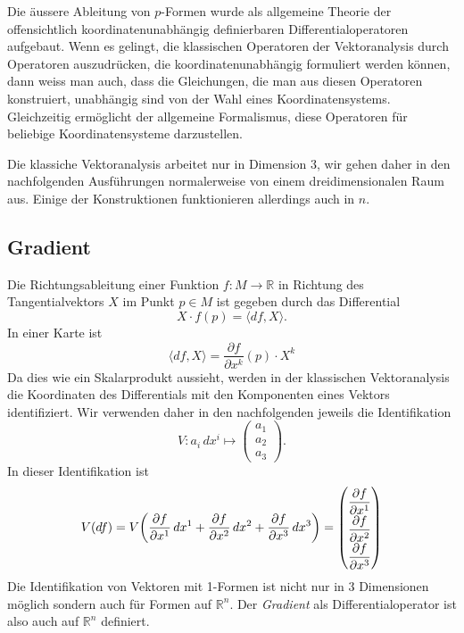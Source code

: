 Die äussere Ableitung von $p$-Formen wurde als allgemeine Theorie
der offensichtlich koordinatenunabhängig definierbaren
Differentialoperatoren aufgebaut.
Wenn es gelingt, die klassischen Operatoren der Vektoranalysis
durch Operatoren auszudrücken, die koordinatenunabhängig formuliert
werden können, dann weiss man auch, dass die Gleichungen, die man
aus diesen Operatoren konstruiert, unabhängig sind von der Wahl
eines Koordinatensystems.
Gleichzeitig ermöglicht der allgemeine Formalismus, diese Operatoren
für beliebige Koordinatensysteme darzustellen.

Die klassiche Vektoranalysis arbeitet nur in Dimension 3, wir gehen
daher in den nachfolgenden Ausführungen normalerweise von einem
dreidimensionalen Raum aus.
Einige der Konstruktionen funktionieren allerdings auch in $n$.

%
%
\subsection{Gradient}
Die Richtungsableitung einer Funktion $f\colon M\to\mathbb{R}$ in 
%
Richtung des Tangentialvektors $X$ im Punkt $p\in M$ ist gegeben
durch das Differential
\[
X\cdot f(p) = \langle df, X\rangle.
\]
In einer Karte ist
\[
\langle df,X\rangle
=
\frac{\partial f}{\partial x^k}(p)
\cdot X^k
\]
Da dies wie ein Skalarprodukt aussieht, werden in der klassischen
Vektoranalysis die Koordinaten des Differentials mit den Komponenten
eines Vektors identifiziert.
Wir verwenden daher in den nachfolgenden jeweils die Identifikation
\[
V\colon
a_i\,dx^i \mapsto \begin{pmatrix} a_1\\a_2\\a_3\end{pmatrix}.
\]
In dieser Identifikation ist
\[
V(df)
=
V\biggl(
\frac{\partial f}{\partial x^1}\,dx^1
+
\frac{\partial f}{\partial x^2}\,dx^2
+
\frac{\partial f}{\partial x^3}\,dx^3
\biggr)
=
\renewcommand{\arraystretch}{1.8}
\begin{pmatrix}
\displaystyle\frac{\partial f}{\partial x^1}\\
\displaystyle\frac{\partial f}{\partial x^2}\\
\displaystyle\frac{\partial f}{\partial x^3}
\end{pmatrix}
\]
Die Identifikation von Vektoren mit 1-Formen ist nicht nur in 
3 Dimensionen möglich sondern auch für Formen auf $\mathbb{R}^n$.
Der {\em Gradient} als Differentialoperator ist also auch auf $\mathbb{R}^n$
%
definiert.

